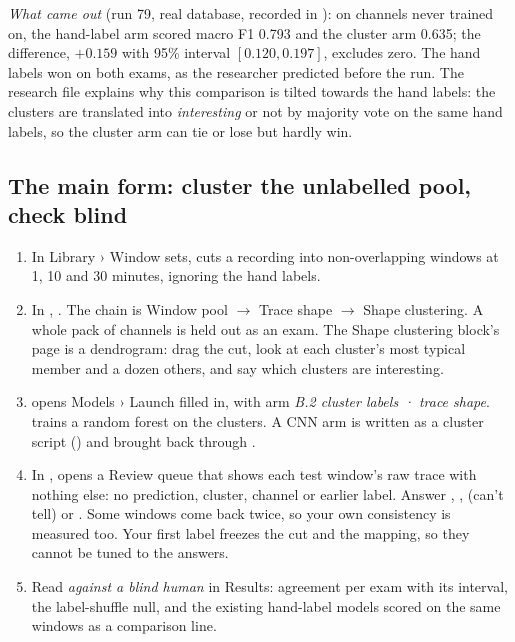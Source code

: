\emph{What came out} (run 79, real database, recorded in
): on channels never trained on, the
hand-label arm scored macro F1 0.793 and the cluster arm 0.635; the difference, $+0.159$
with 95\% interval $[0.120, 0.197]$, excludes zero. The hand labels won on both exams, as the
researcher predicted before the run. The research file explains why this comparison is tilted
towards the hand labels: the clusters are translated into \emph{interesting} or not by
majority vote on the same hand labels, so the cluster arm can tie or lose but hardly win.

\subsection*{The main form: cluster the unlabelled pool, check blind}
\begin{enumerate}
\item In Library › Window sets,  cuts a recording into non-overlapping
  windows at 1, 10 and 30 minutes, ignoring the hand labels.
\item In , . The chain is Window pool
  $\to$ Trace shape $\to$ Shape clustering. A whole pack of channels is held out as an exam.
  The Shape clustering block's page is a dendrogram: drag the cut, look at each cluster's most
  typical member and a dozen others, and say which clusters are interesting.
\item {} opens Models › Launch filled in, with arm \emph{B.2 cluster labels ·
  trace shape}.  trains a random forest on the clusters. A CNN arm is
  written as a cluster script () and brought back through
  .
\item In ,  opens a Review queue that
  shows each test window's raw trace with nothing else: no prediction, cluster, channel or
  earlier label. Answer , ,  (can't tell) or . Some windows come back
  twice, so your own consistency is measured too. Your first label freezes the cut and the
  mapping, so they cannot be tuned to the answers.
\item Read \emph{against a blind human} in Results: agreement per exam with its interval, the
  label-shuffle null, and the existing hand-label models scored on the same windows as a
  comparison line.
\end{enumerate}

